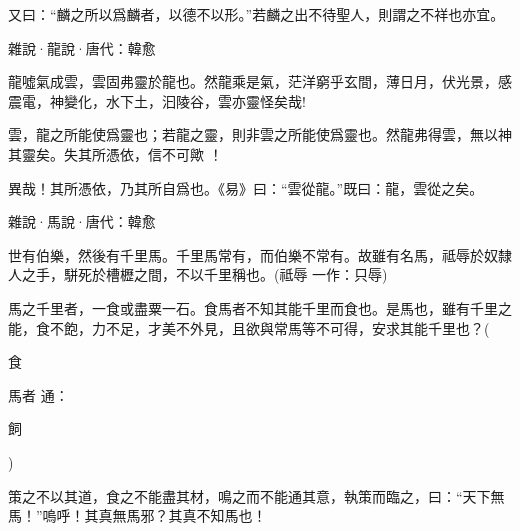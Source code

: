 \documentclass[12pt,a4paper]{ctexbook}
\begin{document}
又曰：“麟之所以爲麟者，以德不以形。”若麟之出不待聖人，則謂之不祥也亦宜。\par
雜說·龍說·唐代：韓愈 \par
龍噓氣成雲，雲固弗靈於龍也。然龍乘是氣，茫洋窮乎玄間，薄日月，伏光景，感震電，神變化，水下土，汩陵谷，雲亦靈怪矣哉!\par
雲，龍之所能使爲靈也；若龍之靈，則非雲之所能使爲靈也。然龍弗得雲，無以神其靈矣。失其所憑依，信不可歟 ！\par
異哉！其所憑依，乃其所自爲也。《易》曰：“雲從龍。”既曰：龍，雲從之矣。\par
雜說·馬說·唐代：韓愈 \par
世有伯樂，然後有千里馬。千里馬常有，而伯樂不常有。故雖有名馬，祗辱於奴隸人之手，駢死於槽櫪之間，不以千里稱也。(祗辱 一作：只辱)\par
馬之千里者，一食或盡粟一石。食馬者不知其能千里而食也。是馬也，雖有千里之能，食不飽，力不足，才美不外見，且欲與常馬等不可得，安求其能千里也？(\par
食\par
馬者 通：\par
飼\par
)\par
策之不以其道，食之不能盡其材，鳴之而不能通其意，執策而臨之，曰：“天下無馬！”嗚呼！其真無馬邪？其真不知馬也！\par
\end{document}
